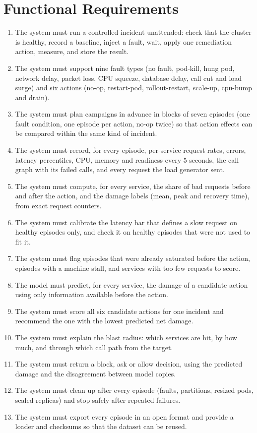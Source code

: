 \documentclass[12pt,a4paper]{report}
\begin{document}
\section{Functional Requirements}
\begin{enumerate}
\item The system must run a controlled incident unattended: check that the cluster is healthy, record a baseline, inject a fault, wait, apply one remediation action, measure, and store the result.
\item The system must support nine fault types (no fault, pod-kill, hung pod, network delay, packet loss, CPU squeeze, database delay, call cut and load surge) and six actions (no-op, restart-pod, rollout-restart, scale-up, cpu-bump and drain).
\item The system must plan campaigns in advance in blocks of seven episodes (one fault condition, one episode per action, no-op twice) so that action effects can be compared within the same kind of incident.
\item The system must record, for every episode, per-service request rates, errors, latency percentiles, CPU, memory and readiness every 5 seconds, the call graph with its failed calls, and every request the load generator sent.
\item The system must compute, for every service, the share of bad requests before and after the action, and the damage labels (mean, peak and recovery time), from exact request counters.
\item The system must calibrate the latency bar that defines a slow request on healthy episodes only, and check it on healthy episodes that were not used to fit it.
\item The system must flag episodes that were already saturated before the action, episodes with a machine stall, and services with too few requests to score.
\item The model must predict, for every service, the damage of a candidate action using only information available before the action.
\item The system must score all six candidate actions for one incident and recommend the one with the lowest predicted net damage.
\item The system must explain the blast radius: which services are hit, by how much, and through which call path from the target.
\item The system must return a block, ask or allow decision, using the predicted damage and the disagreement between model copies.
\item The system must clean up after every episode (faults, partitions, resized pods, scaled replicas) and stop safely after repeated failures.
\item The system must export every episode in an open format and provide a loader and checksums so that the dataset can be reused.
\end{enumerate}
\end{document}
